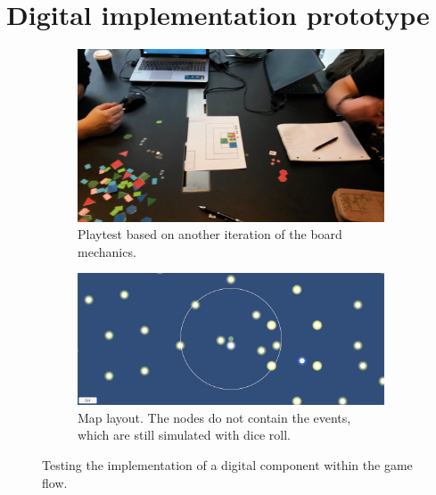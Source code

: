\documentclass[a4paper,11pt]{report}
\begin{document}
\chapter{Digital implementation prototype}
\begin{figure}[!ht]
   \centering
   \begin{subfigure}[b]{\textwidth}
       \includegraphics[width=\textwidth]{Images/proto2.jpg}
       \caption{Playtest based on another iteration of the board mechanics.}
       \label{fig:flowtest}
   \end{subfigure}
   \begin{subfigure}[b]{\textwidth}
       \includegraphics[width=\textwidth]{Images/proto2map.png}
       \caption{Map layout. The nodes do not contain the events, which are still simulated with dice roll.}
       \label{fig:flowmap}
   \end{subfigure}
   \caption{Testing the implementation of a digital component within the game flow.}
   \label{fig:gameflow}
\end{figure}
\end{document}
